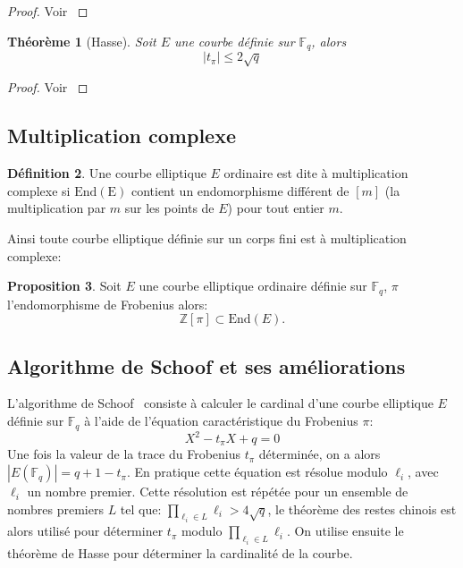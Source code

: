 \documentclass[10pt,a4paper]{book}
\theoremstyle{plain}
\newtheorem{thm}{Théorème}[chapter]
\theoremstyle{definition}
\theoremstyle{definition}
\theoremstyle{definition}
\theoremstyle{definition}
\newtheorem{prop}[thm]{Proposition}
\theoremstyle{definition}
\newtheorem{defi}[thm]{Définition}
\theoremstyle{remark}
\theoremstyle{remark}
\theoremstyle{definition}
\begin{document}
\begin{proof}
Voir \cite[Theorem V.1.1]{Silv1}
\end{proof}

\begin{thm}[Hasse]
Soit $E$ une courbe définie sur $\mathbb{F}_q$, alors 
\begin{equation}
|t_{\pi}| \leqslant 2 \sqrt{q}
\end{equation}
\end{thm}

\begin{proof}
Voir \cite[Theorem V.1.1]{Silv1}
\end{proof}





\subsection{Multiplication complexe}

\begin{defi}
Une courbe elliptique $E$ ordinaire est dite à multiplication complexe si $\mathrm{End(E)}$ contient un endomorphisme différent de $[m]$ (la multiplication par $m$ sur les points de $E$) pour tout entier $m$. 
\end{defi} 

Ainsi toute courbe elliptique définie sur un corps fini est à multiplication complexe:

\begin{prop}
Soit $E$ une courbe elliptique ordinaire définie sur $\mathbb{F}_q$, $\pi$ l'endomorphisme de Frobenius alors: 
\[
\mathbb{Z}[\pi] \subset \mathrm{End}(E).
\]
\end{prop}


\subsection{Algorithme de Schoof et ses améliorations}
\label{sub-sec:schoof}
L'algorithme de Schoof~\cite{Schoof85} consiste à calculer le cardinal d'une courbe elliptique $E$ définie sur $\mathbb{F}_q$ à l'aide de l'équation caractéristique du Frobenius $\pi$:
\begin{equation*}
X^2-t_{\pi}X+q=0
\end{equation*}
Une fois la valeur de la trace du Frobenius $t_{\pi}$ déterminée, on a alors $|E(\mathbb{F}_q)|=q+1-t_{\pi}$. En pratique cette équation est résolue modulo $\ell_i$, avec $\ell_i$ un nombre premier. Cette résolution est répétée pour un ensemble de nombres premiers $L$ tel que: $\prod_{\ell_i \in L}\ell_i>4 \sqrt{q}$, le théorème des restes chinois est alors utilisé pour déterminer $t_{\pi}$ modulo $\prod_{\ell_i \in L}\ell_i$. On utilise ensuite le théorème de Hasse pour déterminer la cardinalité de la courbe.
\end{document}
